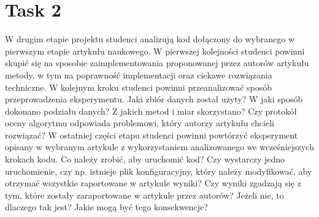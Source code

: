 \documentclass[a4paper]{LTJournalArticle}
\begin{document}
	\section{Task 2}
	W drugim etapie projektu studenci analizują kod dołączony do wybranego
	w pierwszym etapie artykułu naukowego. W pierwszej kolejności studenci
	powinni skupić się na sposobie zaimplementowania proponowanej przez
	autorów artykułu metody, w tym na poprawność implementacji oraz ciekawe
	rozwiązania techniczne.
	W kolejnym kroku studenci powinni przeanalizować sposób
	przeprowadzenia eksperymentu. Jaki zbiór danych został użyty? W jaki sposób
	dokonano podziału danych? Z jakich metod i miar skorzystano? Czy protokół
	oceny algorytmu odpowiada problemowi, który autorzy artykułu chcieli
	rozwiązać?
	W ostatniej części etapu studenci powinni powtórzyć eksperyment opisany
	w wybranym artykule z wykorzystaniem analizowanego we wcześniejszych
	krokach kodu. Co należy zrobić, aby uruchomić kod? Czy wystarczy jedno
	uruchomienie, czy np. istnieje plik konfiguracyjny, który należy modyfikować,
	aby otrzymać wszystkie raportowane w artykule wyniki? Czy wyniki zgadzają się
	z tym, które zostały zaraportowane w artykule przez autorów? Jeżeli nie, to
	dlaczego tak jest? Jakie mogą być tego konsekwencje?
\end{document}
